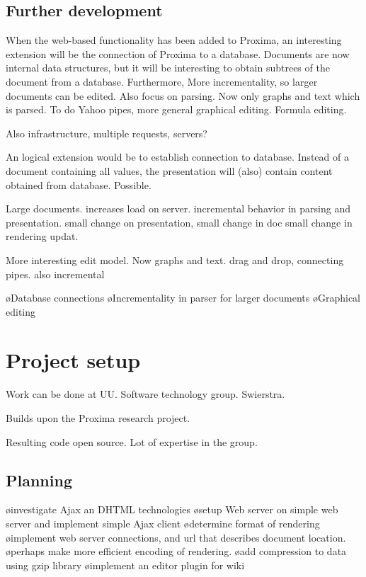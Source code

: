 \documentclass[10pt]{article}
\begin{document}
\subsection{Further development}

\bc
When the web-based functionality has been added to Proxima, an interesting extension will be the connection of Proxima to a database. Documents are now internal data structures, but it will be interesting to obtain subtrees of the document from a database. Furthermore, More incrementality, so larger documents can be edited. Also focus on parsing. Now only graphs and text which is parsed. To do Yahoo pipes, more general graphical editing. Formula editing.

Also infrastructure, multiple requests, servers? 
\ec

An logical extension would be to establish connection to database. Instead of a document containing all values, the presentation will (also) contain content obtained from database. Possible.

Large documents. increases load on server. incremental behavior in parsing and presentation. small change on presentation, small change in doc small change in rendering updat.

More interesting edit model. Now graphs and text. drag and drop, connecting pipes. also incremental

\bl
\o Database connections
\o Incrementality in parser for larger documents
\o Graphical editing
\el

\section{Project setup}

Work can be done at UU. Software technology group. Swierstra.

Builds upon the Proxima research project.

Resulting code open source. Lot of expertise in the group.

\subsection{Planning}

\bl
\o investigate Ajax an DHTML technologies
\o setup Web server on simple web server and implement simple Ajax client
\o determine format of rendering
\o implement web server connections, and url that describes document location.
\o perhaps make more efficient encoding of rendering.
\o add compression to data using gzip library
\o implement an editor plugin for wiki
\el
\end{document}
